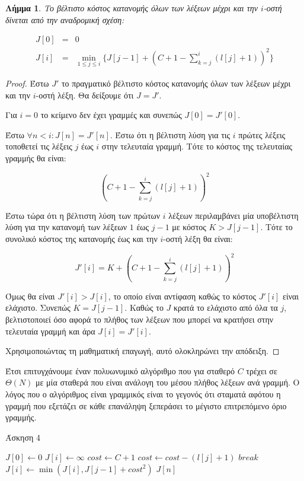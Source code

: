 \documentclass[11pt,a4paper]{book}
\newtheorem*{lemma}{Λήμμα}
\begin{document}
\begin{lemma}
Το βέλτιστο κόστος κατανομής όλων των λέξεων μέχρι και την $i$-οστή δίνεται από την αναδρομική σχέση:

\begin{align*}
J[ 0 ] &=& 0 \\
J[ i ] &=& \min_{1 \leq j \leq i}\{ J[ j - 1 ] + ( C + 1 - \sum_{k=j}^i(l[j] + 1) )^2 \}
\end{align*}
\end{lemma}
\begin{proof}
Έστω $J'$ το πραγματικό βέλτιστο κόστος κατανομής όλων των λέξεων μέχρι και την $i$-οστή λέξη. Θα δείξουμε ότι $J = J'$.

Για $i = 0$ το κείμενο δεν έχει γραμμές και συνεπώς $J[ 0 ] = J'[ 0 ]$.

Έστω $\forall n < i: J[ n ] = J'[ n ]$. Έστω ότι η βέλτιστη λύση για τις $i$ πρώτες λέξεις τοποθετεί τις λέξεις $j$ έως $i$ στην τελευταία γραμμή. Τότε το κόστος της τελευταίας γραμμής θα είναι:

\[
( C + 1 - \sum_{k=j}^i(l[j] + 1) )^2
\]

Έστω τώρα ότι η βέλτιστη λύση των πρώτων $i$ λέξεων περιλαμβάνει μία υποβέλτιστη λύση για την κατανομή των λέξεων $1$ έως $j - 1$ με κόστος $K > J[ j - 1 ]$. Τότε το συνολικό κόστος της κατανομής έως και την $i$-οστή λέξη θα είναι:

\[
J'[ i ] = K + ( C + 1 - \sum_{k=j}^i(l[j] + 1) )^2
\]

Όμως θα είναι $J'[ i ] > J[ i ]$, το οποίο είναι αντίφαση καθώς το κόστος $J'[ i ]$ είναι ελάχιστο. Συνεπώς $K = J[ j - 1 ]$. Καθώς το $J$ κρατά το ελάχιστο από όλα τα $j$, βελτιστοποιεί όσο αφορά το πλήθος των λέξεων που μπορεί να κρατήσει στην τελευταία γραμμή και άρα $J[ i ] = J'[ i ]$.

Χρησιμοποιώντας τη μαθηματική επαγωγή, αυτό ολοκληρώνει την απόδειξη.
\end{proof}

Έτσι επιτυγχάνουμε έναν πολυωνυμικό αλγόριθμο που για σταθερό $C$ τρέχει σε $\Theta( N )$ με μία σταθερά που είναι ανάλογη του μέσου πλήθος λέξεων ανά γραμμή. Ο λόγος που ο αλγόριθμος είναι γραμμικός είναι το γεγονός ότι σταματά αφότου η γραμμή που εξετάζει σε κάθε επανάληψη ξεπεράσει το μέγιστο επιτρεπόμενο όριο γραμμής.

\begin{algorithm}[H]
\caption{\textgreek{Άσκηση 4}}
\begin{algorithmic}[1]
	\State $J[ 0 ] \gets 0$
		\State $J[ i ] \gets \infty$
		\State $cost \gets C + 1$
			\State $cost \gets cost - ( l[ j ] + 1 )$
				\State $break$
			\EndIf
			\State $J[ i ] \gets \min( J[ i ], J[j - 1] + cost^2 )$
		\EndFor
	\EndFor
	\State \Return $J[ n ]$
\EndProcedure
\end{algorithmic}
\end{algorithm}
\end{document}
